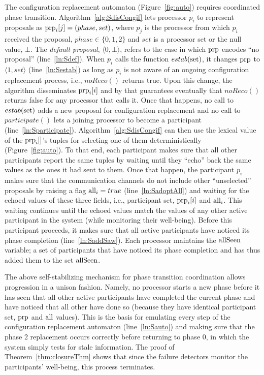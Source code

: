 \documentclass[11pt]{article}
\begin{document}
{
The configuration replacement automaton (Figure~\ref{fig:auto}) requires coordinated phase transition.
Algorithm~\ref{alg:SdisCongif} lets processor $p_i$ to represent proposals as $\textnormal{prp}_i[j]=(phase, set)$, where $p_j$ is the processor from which $p_i$ received the proposal, $phase \in \{0,1, 2\}$ and $set$ is a processor set or the null value, $\bot$. The \emph{default proposal}, $\langle 0, \bot \rangle$, refers to the case in which $\textnormal{prp}$ encodes ``no proposal'' (line~\ref{ln:Sdef}). 
When $p_i$ calls the function $estab(\textnormal{set})$, it changes $\textnormal{prp}$ to $\langle 1, set \rangle$ (line~\ref{ln:Sestab}) as long as $p_i$ is not aware of an ongoing configuration replacement process, i.e., $noReco()$ returns true. Upon this change, the algorithm disseminates $\textnormal{prp}_i[i]$ and by that guarantees eventually that $noReco()$ returns false for any processor that calls it. Once that happens, no call to $estab(\textnormal{set})$ adds a new proposal for configuration replacement and no call to $participate()$ lets a joining processor to become a participant (line~\ref{ln:Sparticipate}). Algorithm~\ref{alg:SdisCongif} can then use the lexical value of the $\textnormal{prp}_i[]$'s tuples for selecting one of them deterministically (Figure~\ref{fig:auto}). To that end, each participant makes sure that all other participants report the same tuples by waiting until they ``echo'' back the same values as the ones it had sent to them. Once that happen, the participant $p_i$ makes sure that the communication channels do not include other ``unselected'' proposals by raising a flag $\textnormal{all}_i=true$ (line~\ref{ln:SadoptAll}) and waiting for the echoed values of these three fields, i.e., participant set, $\textnormal{prp}_i[i]$ and $\textnormal{all}_i$. This waiting continues until the echoed values match the values of any other active participant in the system (while monitoring their well-being). Before this participant proceeds, it makes sure that all active participants have noticed its phase completion (line~\ref{ln:SaddSaw}). Each processor maintains the $\textnormal{allSeen}$ variable; a set of participants that have noticed its phase completion and has thus added them to the set $\textnormal{allSeen}$.

The above self-stabilizing mechanism for phase transition coordination allows progression in a unison fashion. Namely, no processor starts a new phase before it has seen that all other active participants have completed the current phase and have noticed that all other have done so (because they have identical participant set, $\textnormal{prp}$ and $\textnormal{all}$ values). This is the basis for emulating every step of the configuration replacement automaton (line~\ref{ln:Sauto}) and making sure that the phase 2 replacement occurs correctly before returning to phase 0, in which the system simply tests for stale information. The proof of Theorem~\ref{thm:closureThm} shows that since the failure detectors monitor the participants' well-being, this process terminates.


\newpage
}
\end{document}
